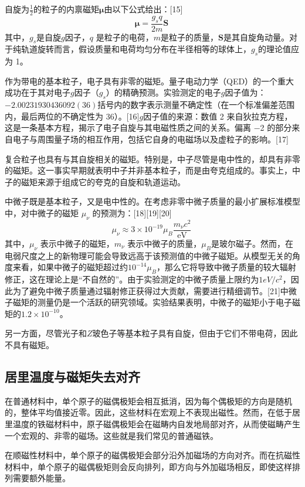 自旋为\(\frac{1}{2}\)的粒子的内禀磁矩\(\boldsymbol{\mu}\)由以下公式给出：[15]  
\[
\boldsymbol{\mu} = \frac{g_s q}{2m} \mathbf{S}~
\]  
其中，\(g_s\)是自旋\(g\)因子，\( q \) 是粒子的电荷，\( m \)是粒子的质量，\(\mathbf{S}\)是其自旋角动量。对于纯轨道旋转而言，假设质量和电荷均匀分布在半径相等的球体上，\(g_s\)的理论值应为 1。

作为带电的基本粒子，电子具有非零的磁矩。量子电动力学（QED）的一个重大成功在于其对电子\(g\)因子（\(g_s\)）的精确预测。实验测定的电子\(g\)因子值为：\(-2.00231930436092(36)\)括号内的数字表示测量不确定性（在一个标准偏差范围内，最后两位的不确定性为 36）。[16]\(g\)因子值的来源：数值 2 来自狄拉克方程，这是一条基本方程，揭示了电子自旋与其电磁性质之间的关系。偏离 −2 的部分来自电子与周围量子场的相互作用，包括它自身的电磁场以及虚粒子的影响。[17]

复合粒子也具有与其自旋相关的磁矩。特别是，中子尽管是电中性的，却具有非零的磁矩。这一事实早期就表明中子并非基本粒子，而是由夸克组成的。事实上，中子的磁矩来源于组成它的夸克的自旋和轨道运动。  

中微子既是基本粒子，又是电中性的。在考虑非零中微子质量的最小扩展标准模型中，对中微子的磁矩 \( \mu_\nu\) 的预测为：[18][19][20]  
\[
\mu_{\nu} \approx 3 \times 10^{-19} \mu_B \frac{m_{\nu} c^2}{\text{eV}}~
\]  
其中，\(\mu_{\nu}\) 表示中微子的磁矩，\( m_{\nu} \) 表示中微子的质量，\(\mu_B\)是玻尔磁子。然而，在电弱尺度之上的新物理可能会导致远高于该预测值的中微子磁矩。从模型无关的角度来看，如果中微子的磁矩超过约\(10^{-14} \mu_B\)，那么它将导致中微子质量的较大辐射修正，这在理论上是“不自然的”。由于实验测定的中微子质量上限约为\(1eV/c^2 \)，因此为了避免中微子质量通过辐射修正获得过大贡献，需要进行精细调节。[21]中微子磁矩的测量仍是一个活跃的研究领域。实验结果表明，中微子的磁矩小于电子磁矩的\( 1.2 \times 10^{-10}\)。  

另一方面，尽管光子和\(Z\)玻色子等基本粒子具有自旋，但由于它们不带电荷，因此不具有磁矩。
\subsection{居里温度与磁矩失去对齐} 
在普通材料中，单个原子的磁偶极矩会相互抵消，因为每个偶极矩的方向是随机的，整体平均值接近零。因此，这些材料在宏观上不表现出磁性。然而，在低于居里温度的铁磁材料中，原子磁偶极矩会在磁畴内自发地局部对齐，从而使磁畴产生一个宏观的、非零的磁场。这些就是我们常见的普通磁铁。  

在顺磁性材料中，单个原子的磁偶极矩会部分沿外加磁场的方向对齐。而在抗磁性材料中，单个原子的磁偶极矩则会反向排列，即方向与外加磁场相反，即使这样排列需要额外能量。  


